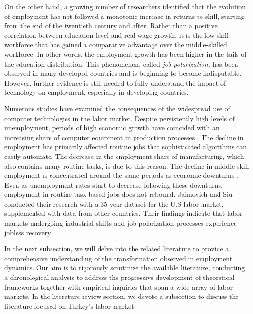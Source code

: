 \begin{onehalfspace}
On the other hand, a growing number of researchers identified that
the evolution of employment has not followed a monotonic increase
in returns to skill, starting from the end of the twentieth century
and after. Rather than a positive correlation between education level
and real wage growth, it is the low-skill workforce that has gained
a comparative advantage over the middle-skilled workforce. In other
words, the employment growth has been higher in the tails of the education
distribution. This phenomenon, called \emph{job polarization}, has
been observed in many developed countries and is beginning to become
indisputable. However, further evidence is still needed to fully understand
the impact of technology on employment, especially in developing countries.

Numerous studies have examined the consequences of the widespread
use of computer technologies in the labor market. Despite persistently
high levels of unemployment, periods of high economic growth have
coincided with an increasing share of computer equipment in production
processes \citep{Brynjolfsson2014}. The decline in employment has
primarily affected routine jobs that sophisticated algorithms can
easily automate. The decrease in the employment share of manufacturing,
which also contains many routine tasks, is due to this reason. The
decline in middle skill employment is concentrated around the same
periods as economic downturns \citep{2018Charles}. Even as unemployment
rates start to decrease following these downturns, employment in routine
task-based jobs does not rebound. Jaimovich and Siu \citeyearpar{2020Jaimovich}
conducted their research with a 35-year dataset for the U.S labor
market, supplemented with data from other countries. Their findings
indicate that labor markets undergoing industrial shifts and job polarization
processes experience jobless recovery.

In the next subsection, we will delve into the related literature
to provide a comprehensive understanding of the transformation observed
in employment dynamics. Our aim is to rigorously scrutinize the available
literature, conducting a chronological analysis to address the progressive
development of theoretical frameworks together with empirical inquiries
that span a wide array of labor markets. In the literature review
section, we devote a subsection to discuss the literature focused
on Turkey's labor market. %

\end{onehalfspace}
